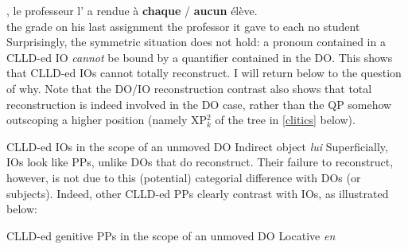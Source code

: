 \documentclass[output=paper]{langsci/langscibook}
\begin{document}
\ea
    ,       le     professeur        l' {a rendue}
\`{a}  \textbf{chaque} / \textbf{aucun}   \'{e}l\`{e}ve.\\
    {}  the    grade  on  his    last       assignment  the   professor   it
     gave      to  each {} no        student\\
\z
%
Surprisingly, the symmetric situation does not hold: a pronoun contained in a
\gls{CLLD}-ed IO {\it cannot} be bound by a quantifier contained in the DO.
This shows that  \gls{CLLD}-ed \glspl{IO} cannot totally reconstruct.
I will return below to the question of why. Note that the DO/IO reconstruction
contrast also shows that total reconstruction is indeed involved in the DO
case, rather than the QP somehow outscoping a higher position (namely XP$_k^2$
of the tree in \eqref{clitics} below).

\ea *CLLD-ed IOs in the scope of an unmoved DO \hfill{Indirect object  {\it lui}} \label{scofree}
\z
\z
%
Superficially, \glspl{IO} look like PPs, unlike \glspl{DO} that do reconstruct.
Their failure to reconstruct, however, is not due to this (potential)
categorial difference with \glspl{DO} (or subjects). Indeed, other
\gls{CLLD}-ed PPs clearly contrast with \glspl{IO}, as illustrated below:

\ea \gls{CLLD}-ed genitive PPs in the scope of an unmoved DO \hfill{Locative {\it en}}
\z
\z
\end{document}
